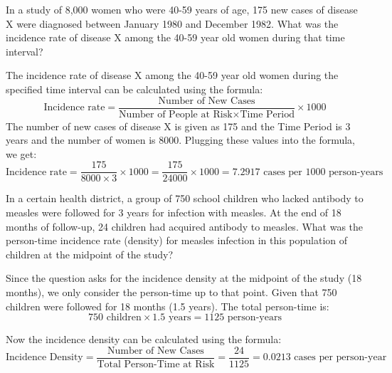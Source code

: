 \documentclass[a4paper]{exam}
\begin{document}
\begin{questions}
    \question[10]
    In a study of 8,000 women who were 40-59 years of age, 175 new cases of disease X were diagnosed between January 1980 and December 1982. What was the incidence rate of disease X among the 40-59 year old women during that time interval?
    \begin{solution}
        The incidence rate of disease X among the 40-59 year old women during the specified time interval can be calculated using the formula:
        \begin{equation*}
            \text{Incidence rate} = \frac{\text{Number of New Cases}}{\text{Number of People at Risk} \times \text{Time Period}} \times 1000
        \end{equation*}
        The number of new cases of disease X is given as 175 and the Time Period is 3 years and the number of women is 8000. Plugging these values into the formula, we get:
        \begin{equation*}
            \text{Incidence rate} = \frac{175}{8000 \times 3} \times 1000 = \frac{175}{24000} \times 1000 = 7.2917 \text{ cases per 1000 person-years}
        \end{equation*}
    \end{solution}

    \question[10]
    In a certain health district, a group of 750 school children who lacked antibody to measles were followed for 3 years for infection with measles. At the end of 18 months of follow-up, 24 children had acquired antibody to measles. What was the person-time incidence rate (density) for measles infection in this population of children at the midpoint of the study?
    \begin{solution}
        Since the question asks for the incidence density at the midpoint of the study (18 months), we only consider the person-time up to that point.
        Given that 750 children were followed for 18 months (1.5 years). The total person-time is:
        \begin{equation*}
            750 \text{ children} \times 1.5 \text{ years} = 1125 \text{ person-years}
        \end{equation*}

        Now the incidence density can be calculated using the formula:
        \begin{equation*}
            \text{Incidence Density} = \frac{\text{Number of New Cases}}{\text{Total Person-Time at Risk}} = \frac{24}{1125} = 0.0213 \text{ cases per person-year}
        \end{equation*}


\end{solution}
\end{questions}
\end{document}
